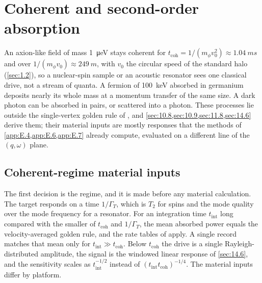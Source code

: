 \section{Coherent and second-order absorption}\label{app:E.26}

An axion-like field of mass \SI{1}{\micro eV} stays coherent for $t_{\mathrm{coh}} = 1/(m_\phi v_0^2) \approx \SI{1.04}{ms}$ and over $1/(m_\phi v_0) \approx \SI{249}{m}$, with $v_0$ the circular speed of the standard halo (\cref{sec:1.2}), so a nuclear-spin sample or an acoustic resonator sees one classical drive, not a stream of quanta. A fermion of \SI{100}{keV} absorbed in germanium deposits nearly its whole mass at a momentum transfer of the same size. A dark photon can be absorbed in pairs, or scattered into a photon. These processes lie outside the single-vertex golden rule of , and \cref{sec:10.8,sec:10.9,sec:11.8,sec:14.6} derive them; their material inputs are mostly responses that the methods of \cref{app:E.4,app:E.6,app:E.7} already compute, evaluated on a different line of the $(q, \omega)$ plane.

\subsection{Coherent-regime material inputs}

The first decision is the regime, and it is made before any material calculation. The target responds on a time $1/\varGamma_T$, which is $T_2$ for spins and the mode quality over the mode frequency for a resonator. For an integration time $t_{\mathrm{int}}$ long compared with the smaller of $t_{\mathrm{coh}}$ and $1/\varGamma_T$, the mean absorbed power equals the velocity-averaged golden rule, and the rate tables of  apply. A single record matches that mean only for $t_{\mathrm{int}} \gg t_{\mathrm{coh}}$. Below $t_{\mathrm{coh}}$ the drive is a single Rayleigh-distributed amplitude, the signal is the windowed linear response of \cref{sec:14.6}, and the sensitivity scales as $t_{\mathrm{int}}^{-1/2}$ instead of $(t_{\mathrm{int}}t_{\mathrm{coh}})^{-1/4}$. The material inputs differ by platform.

